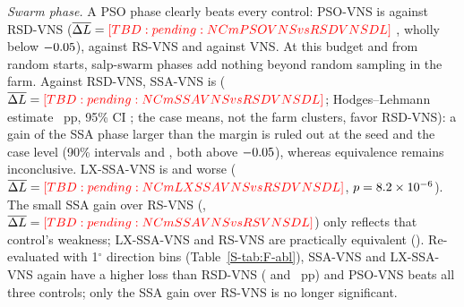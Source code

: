 \emph{Swarm phase.} A PSO phase clearly beats every control: PSO-VNS is \NAblPSOVNSvsRSDVNS{} against RSD-VNS ($\overline{\Delta L}=\NCmPSOVNSvsRSDVNSDL$ \NEqPSOVNSvsRSDVNSCI, wholly below $-0.05$), \NAblPSOVNSvsRSVNS{} against RS-VNS and \NAblPSOVNSvsVNS{} against VNS. At this budget and from random starts, salp-swarm phases add nothing beyond random sampling in the farm. Against RSD-VNS, SSA-VNS is \NAblSSAVNSvsRSDVNS{} ($\overline{\Delta L}=\NCmSSAVNSvsRSDVNSDL$; Hodges--Lehmann estimate \NXHLSSAVNSvsRSDVNS~pp, 95\% CI \NXHLSSAVNSvsRSDVNSCI; the case means, not the farm clusters, favor RSD-VNS): a gain of the SSA phase larger than the margin is ruled out at the seed and the case level (90\% intervals \NXEqSeedSSAVNSvsRSDVNSCI{} and \NXEqCaseSSAVNSvsRSDVNSCI, both above $-0.05$), whereas equivalence remains inconclusive. LX-SSA-VNS is \NAblLXSSAVNSvsRSDVNS{} and worse ($\overline{\Delta L}=\NCmLXSSAVNSvsRSDVNSDL$, $p=8.2\times10^{-6}$). The small SSA gain over RS-VNS (\NAblSSAVNSvsRSVNS, $\overline{\Delta L}=\NCmSSAVNSvsRSVNSDL$) only reflects that control's weakness; LX-SSA-VNS and RS-VNS are practically equivalent (\NEqLXSSAVNSvsRSVNSCI). Re-evaluated with 1$^\circ$ direction bins (Table~\ref{S-tab:F-abl}), SSA-VNS and LX-SSA-VNS again have a higher loss than RSD-VNS (\NFAblSSAVNSvsRSDVNSOne{} and \NFAblLXSSAVNSvsRSDVNSOne~pp) and PSO-VNS beats all three controls; only the SSA gain over RS-VNS is no longer significant.


